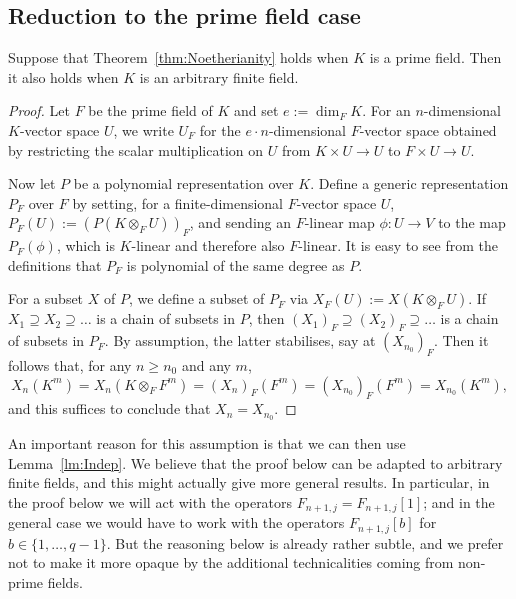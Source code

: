 \documentclass{amsart}
\begin{document}
\subsection{Reduction to the prime field case}

\begin{prop} \label{prop:PrimeField}
Suppose that Theorem~\ref{thm:Noetherianity} holds when $K$
is a prime field. Then it also holds when $K$ is an
arbitrary finite field.
\end{prop}

\begin{proof}
Let $F$ be the prime field of $K$ and set $e:=\dim_F K$. For
an $n$-dimensional $K$-vector space $U$, we write $U_F$ for the
$e \cdot n$-dimensional $F$-vector space obtained by restricting the scalar
multiplication on $U$ from $K \times U \to U$ to $F \times U \to U$.

Now let $P$ be a polynomial representation over $K$. Define a generic
representation $P_F$ over $F$ by setting, for a finite-dimensional
$F$-vector space $U$, $P_F(U):=(P(K \otimes_F U))_F$, and sending an
$F$-linear map $\phi:U \to V$ to the map $P_F(\phi)$, which is $K$-linear
and therefore also $F$-linear. It is easy to see from the definitions
that $P_F$ is polynomial of the same degree as $P$.

For a subset $X$ of $P$, we define a subset of $P_F$ via
$X_F(U):=X(K \otimes_F U)$. If $X_1 \supseteq X_2 \supseteq \ldots$ is a
chain of subsets in $P$, then $(X_1)_F \supseteq (X_2)_F \supseteq \ldots$
is a chain of subsets in $P_F$. By assumption, the latter
stabilises, say at $(X_{n_0})_F$. Then it follows that, for any
$n \geq n_0$ and any $m$, 
\[ X_{n}(K^m)=X_{n}(K \otimes_F F^m)=(X_{n})_F(F^m)
=(X_{n_0})_F(F^m)=X_{n_0}(K^m), \]
and this suffices to conclude that $X_n=X_{n_0}$. 
\end{proof}

\begin{center}
\end{center}

An important reason for this assumption is that we can
then use Lemma~\ref{lm:Indep}. We believe that the proof below can be
adapted to arbitrary finite fields, and this might actually give more
general results. 
In particular, in the proof below we will act with the operators
$F_{n+1,j}=F_{n+1,j}[1]$; and in the general case we would have to work
with the operators $F_{n+1,j}[b]$ for $b \in \{1,\ldots,q-1\}$.  But the
reasoning below is already rather subtle, and we prefer not to make it
more opaque by the additional technicalities coming from non-prime fields.
\end{document}
